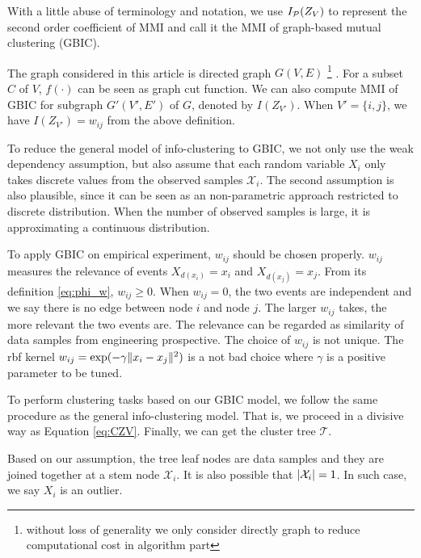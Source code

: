 With a little abuse of terminology and notation, we use $I_{\P}(Z_V)$ to represent the second order coefficient of MMI and call it the MMI of graph-based mutual clustering (GBIC). 

The graph considered in this article is directed graph $G(V, E)$
\footnote{without loss of generality we only consider directly graph to reduce computational cost in algorithm part}
. For a subset $C$ of $V$, $f(\cdot)$ can be seen as graph cut function. We can also compute MMI of GBIC for subgraph $G'(V',E')$ of $G$, denoted by $I(Z_{V'})$. When $V'=\{i,j\}$, we have $I(Z_{V'})=w_{ij}$ from the above definition.

To reduce the general model of info-clustering to GBIC, we not only use the weak dependency assumption, but also assume that each random variable $X_i$ only takes discrete values from the observed samples $\mathcal{X}_i$. The second assumption is also plausible, since it can be seen as an non-parametric approach restricted to discrete distribution. When the number of observed samples is large, it is approximating a continuous distribution.

To apply GBIC on empirical experiment, $w_{ij}$ should be chosen properly. $w_{ij}$ measures the relevance of events $X_{d(x_i)} = x_i$
and $X_{d(x_j)} = x_j$. 
From its definition \eqref{eq:phi_w}, $w_{ij} \geq 0$. When $w_{ij} = 0$, the two events are independent and we say there is no edge between
node $i$ and node $j$. The larger $w_{ij}$ takes, the more relevant the two events are. The relevance can be regarded as similarity of data samples 
from engineering prospective. The choice of $w_{ij}$ is not unique. The rbf kernel $w_{ij} = \exp(-\gamma \norm{x_i - x_j}^2)$ is a not bad choice
where $\gamma$ is a positive parameter to be tuned.

To perform clustering tasks based on our GBIC model, we follow the same procedure as the general info-clustering model. That is, we proceed in a divisive way as Equation \eqref{eq:CZV}. Finally, we can get the cluster tree $\mathcal{T}$.

Based on our assumption, the tree leaf nodes are data samples and they are joined together at a stem node $\mathcal{X}_i$. It is also possible that $\abs{\mathcal{X}_i} = 1$. In such case, we say $X_i$ is an outlier.


